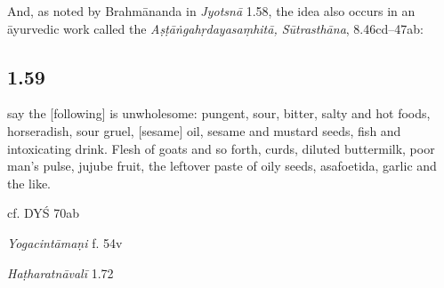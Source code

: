 \begin{ekdosis}
\begin{philcomm}[hp01_058]
And, as noted by Brahmānanda in \emph{Jyotsnā} 1.58, the idea also occurs in an āyurvedic work called the \emph{Aṣṭāṅgahṛdayasaṃhitā, Sūtrasthāna}, 8.46cd–47ab: 

\begin{versinnote}
\end{versinnote} 

\end{philcomm}

\subsection*{1.59}
\begin{translation}[hp01_059]
[Adepts] say the [following] is unwholesome: pungent, sour, bitter, salty and hot foods, horseradish, sour gruel, [sesame] oil, sesame and mustard seeds, fish and intoxicating drink. Flesh of goats and so forth, curds, diluted buttermilk, poor man's pulse, jujube fruit, the leftover paste of oily seeds, asafoetida, garlic and the like.
\end{translation}

\begin{sources}[hp01_059]
cf. DYŚ 70ab
\end{sources}

\begin{testimonia}[hp01_059]
\emph{Yogacintāmaṇi} f. 54v

\begin{versinnote}
\end{versinnote}

\emph{Haṭharatnāvalī} 1.72

\begin{versinnote}
\end{versinnote}


\end{testimonia}
\end{ekdosis}
